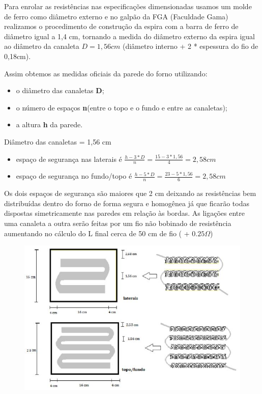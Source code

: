Para enrolar as resistências nas especificações dimensionadas usamos um molde de ferro como diâmetro externo e no galpão da FGA (Faculdade Gama) realizamos o procedimento de construção da espira com a barra de ferro de diâmetro igual a 1,4 cm, tornando a medida do diâmetro externo da espira igual ao diâmetro da canaleta $D = 1,56 cm$ (diâmetro interno + 2 * espessura do fio de 0,18cm).

Assim obtemos as medidas oficiais da parede do forno utilizando:
\begin{itemize}
	\item o diâmetro das canaletas \textbf{D};
	\item o número de espaços \textbf{n}(entre o topo e o fundo e entre as canaletas);
	\item a altura \textbf{h} da parede.
\end{itemize}

Diâmetro das canaletas = 1,56 cm
\begin{itemize}
	\item espaço de segurança nas laterais é $\frac{h-3*D}{n} = \frac{15 - 3 * 1,56}{4} = 2,58 cm$
	\item espaço de segurança no fundo/topo é $\frac{h-5*D}{n} = \frac{23 - 5 * 1,56}{6} = 2,58 cm$
\end{itemize}

Os dois espaços de segurança são maiores que 2 cm deixando as resistências bem distribuídas dentro do forno de forma segura e homogênea já que ficarão todas dispostas simetricamente nas paredes em relação às bordas.
As ligações entre uma canaleta a outra serão feitas por um fio não bobinado de resistência aumentando no cálculo do L final cerca de 50 cm de fio ( + $0.25\Omega$)
\begin{figure}[ht]
	\centering
	\label{resistencia3}
	\includegraphics[keepaspectratio=true,scale=1.0]{figuras/alimentacao5.JPG}
\end{figure}

